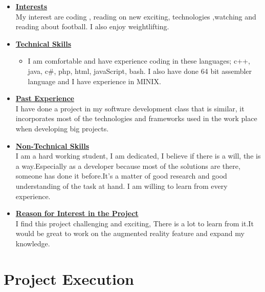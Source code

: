 \documentclass[a4paper,12pt]{article}
\begin{document}
\begin{itemize}
\item {\large \underline{\textbf{Interests}}}\\[0.2cm]
My interest are coding , reading on new exciting, technologies ,watching and reading about football. I also enjoy weightlifting.


\item {\large \underline{\textbf{Technical Skills}}}

	\begin{itemize}
		\item I am comfortable and have experience coding in these languages; c++, java, c\#, php, html, javaScript, bash. I also have done 64 bit assembler language and I have experience in MINIX.
	\end{itemize}
\bigskip
\item {\large \underline{\textbf{Past Experience}}}\\[0.2cm]
I have done a project in my software development class that is similar, it incorporates  most of the technologies and frameworks used in the work place when developing big projects.
\\
\item {\large \underline{\textbf{Non-Technical Skills}}}\\[0.2cm]
 I am a hard working student, I am dedicated, I believe if there is a will, the is a way.Especially as a developer because most of the solutions are there, someone has done it before.It's a matter of good research and good understanding of the task at hand. I am willing to learn from every experience. 
\\
\item {\large \underline{\textbf{Reason for Interest in the Project}}}\\[0.2cm]
I find this project challenging and exciting, There is a lot to learn from it.It would be great to work on the augmented reality feature and expand my knowledge.

\end{itemize}

\newpage
\section{Project Execution}
\end{document}
